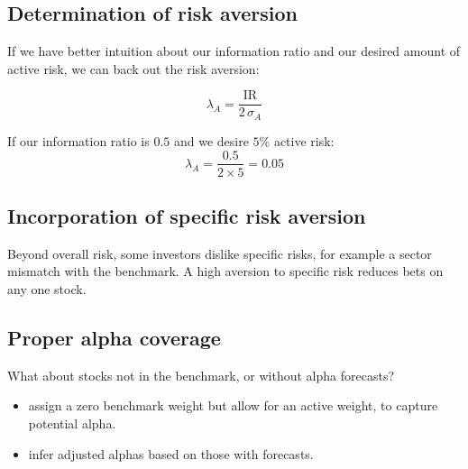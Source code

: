 \subsection{Determination of risk aversion}

If we have better intuition about our information ratio and our desired amount of
active risk, we can back out the risk aversion:

\begin{imfmlbox}
\[ \lambda_A = \frac{\text{IR}}{2\,\sigma_A} \]
\end{imfmlbox}

\begin{imexbox}[title={Backing out a risk aversion}]
If our information ratio is $0.5$ and we desire $5\%$ active risk:
\[ \lambda_A = \frac{0.5}{2 \times 5} = 0.05 \]
\end{imexbox}

\subsection{Incorporation of specific risk aversion}

Beyond overall risk, some investors dislike specific risks, for example a sector
mismatch with the benchmark. A high aversion to specific risk reduces bets on any
one stock.

\subsection{Proper alpha coverage}

What about stocks not in the benchmark, or without alpha forecasts?

\begin{itemize}
\item {} assign a zero benchmark weight but
allow for an active weight, to capture potential alpha.
\item {} infer adjusted alphas based on those
with forecasts.
\end{itemize}


